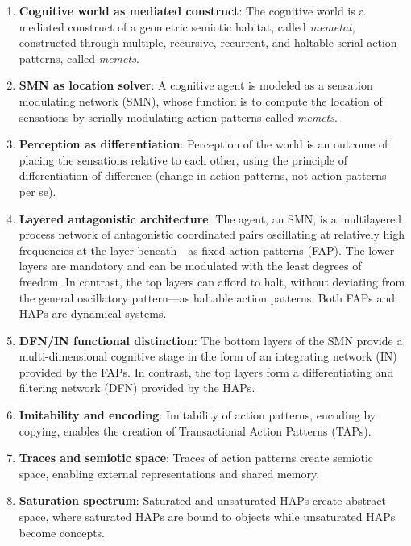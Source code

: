 \begin{enumerate}
    \item \textbf{Cognitive world as mediated construct}: The cognitive world is a mediated construct of a geometric semiotic habitat, called \textit{memetat}, constructed through multiple, recursive, recurrent, and haltable serial action patterns, called \textit{memets}.
    
    \item \textbf{SMN as location solver}: A cognitive agent is modeled as a sensation modulating network (SMN), whose function is to compute the location of sensations by serially modulating action patterns called \textit{memets}.
    
    \item \textbf{Perception as differentiation}: Perception of the world is an outcome of placing the sensations relative to each other, using the principle of differentiation of difference (change in action patterns, not action patterns per se).
    
    \item \textbf{Layered antagonistic architecture}: The agent, an SMN, is a multilayered process network of antagonistic coordinated pairs oscillating at relatively high frequencies at the layer beneath---as fixed action patterns (FAP). The lower layers are mandatory and can be modulated with the least degrees of freedom. In contrast, the top layers can afford to halt, without deviating from the general oscillatory pattern---as haltable action patterns. Both FAPs and HAPs are dynamical systems.
    
    \item \textbf{DFN/IN functional distinction}: The bottom layers of the SMN provide a multi-dimensional cognitive stage in the form of an integrating network (IN) provided by the FAPs. In contrast, the top layers form a differentiating and filtering network (DFN) provided by the HAPs.
    
    \item \textbf{Imitability and encoding}: Imitability of action patterns, encoding by copying, enables the creation of Transactional Action Patterns (TAPs).
    
    \item \textbf{Traces and semiotic space}: Traces of action patterns create semiotic space, enabling external representations and shared memory.
    
    \item \textbf{Saturation spectrum}: Saturated and unsaturated HAPs create abstract space, where saturated HAPs are bound to objects while unsaturated HAPs become concepts.
    

\end{enumerate}
